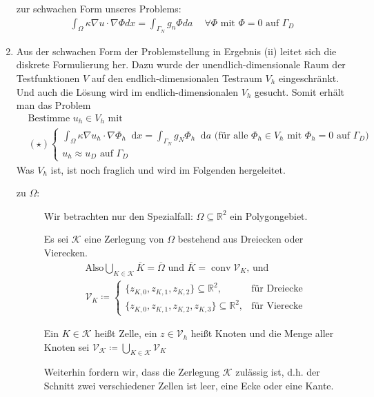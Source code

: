 \documentclass[12pt,a4paper]{scrartcl}
\newcommand{\R}{\mathbb{R}}
\newcommand*\diff{\mathop{}\!\mathrm{d}}
\DeclareMathOperator{\conv}{conv}
\newcommand{\defi}[1]{\textcolor{Mygreen}{#1}}
\numberwithin{equation}{section}
\begin{document}
\begin{enumerate}[label=(\roman*)]
zur \defi{schwachen Form} unseres Problems:
\begin{align*}
\int_{\Omega}{ \kappa \nabla u \cdot \nabla \Phi dx} = \int_{ \Gamma_N }{g_n \Phi da} \text{  } \; \; \forall \Phi \text{ mit } \Phi = 0 \text{ auf } \Gamma_D
\end{align*}

\item
Aus der schwachen Form der Problemstellung in Ergebnis (ii) leitet sich die diskrete Formulierung her. Dazu wurde der unendlich-dimensionale Raum der Testfunktionen $V$ auf den endlich-dimensionalen Testraum $V_h$ eingeschränkt. Und auch die Lösung wird im endlich-dimensionalen $V_h$ gesucht. Somit erhält man das Problem
\begin{align*}
&\text{Bestimme } u_h \in V_h \text{ mit }\\
&(\star)\begin{cases}
	\int_{\Omega} \kappa \nabla u_h \cdot \nabla \Phi_h \diff x = \int_{\Gamma_N} g_N  \Phi_h \diff a \text{ (für alle } \Phi_h \in V_h \text{ mit } \Phi_h = 0 \text{ auf } \Gamma_D) \\
	u_h \approx u_D \text{ auf } \Gamma_D
\end{cases}
\end{align*}
Was $ V_h $ ist, ist noch fraglich und wird im Folgenden hergeleitet.
\begin{description}
	\item [zu $\Omega$:]
	Wir betrachten nur den Spezialfall: $\Omega \subseteq \R^2$ ein Polygongebiet. 
	
	Es sei $\mathcal{K}$ eine Zerlegung von $\Omega$ bestehend aus Dreiecken oder Vierecken.
	\begin{align*}
	\text{Also} \bigcup_{K \in \mathcal{K}} \overline{K} = \overline{\Omega} \text{ und } \overline{K} = \conv \mathcal{V}_K \text{, und}\\
	\mathcal{V}_K \coloneqq
	 \begin{cases}
	\{z_{K,0}, z_{K,1}, z_{K,2}\} \subseteq \R^2, &\text{für Dreiecke} \\
	\{z_{K,0}, z_{K,1}, z_{K,2}, z_{K,3}\} \subseteq \R^2, &\text{für Vierecke}
	\end{cases}
	\end{align*}
	
	Ein $ K \in \mathcal{K} $ heißt \defi{Zelle}, ein $ z \in \mathcal{V}_h $ heißt \defi{Knoten} und die Menge aller Knoten sei $\mathcal{V}_\mathcal{K} \coloneqq \bigcup_{K \in \mathcal{K}} \mathcal{V}_K$
	
	Weiterhin fordern wir, dass die Zerlegung $\mathcal{K}$ zulässig ist, d.h. der Schnitt zwei verschiedener Zellen ist leer, eine Ecke oder eine Kante.
	

\end{description}
\end{enumerate}
\end{document}
